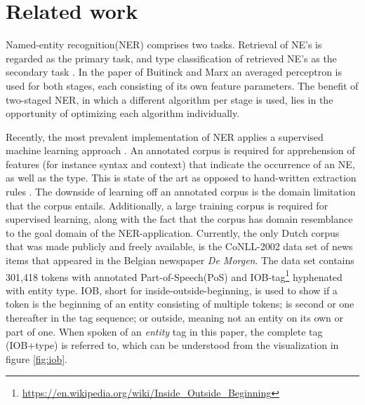 
\section{Related work} \label{sec:rel}
Named-entity recognition(NER) comprises two tasks. Retrieval of NE's is regarded as the primary task, and type classification of retrieved NE's as the secondary task \cite{buitinck2012two}. In the paper of Buitinck and Marx an averaged perceptron is used for both stages, each consisting of its own feature parameters. The benefit of two-staged NER, in which a different algorithm per stage is used, lies in the opportunity of optimizing each algorithm individually.  

Recently, the most prevalent implementation  of NER applies a supervised machine learning approach . An annotated corpus is required for apprehension of features (for instance syntax and context) that indicate the occurrence of an NE, as well as the type. This is state of the art as opposed to hand-written extraction rules . The downside of learning off an annotated corpus is the domain limitation that the corpus entails. Additionally, a large training corpus is required for supervised learning, along with the fact that the corpus has domain resemblance to the goal domain of the NER-application. Currently, the only Dutch corpus that was made publicly and freely available, is the CoNLL-2002 data set of news items that appeared in the Belgian newspaper \textit{De Morgen}. The data set contains 301,418 tokens with annotated Part-of-Speech(PoS) and IOB-tag\footnote{\url{https://en.wikipedia.org/wiki/Inside_Outside_Beginning}} hyphenated with entity type. IOB, short for inside-outside-beginning, is used to show if a token is the beginning of an entity consisting of multiple tokens; is second or one thereafter in the tag sequence; or outside, meaning not an entity on its own or part of one. When spoken of an \textit{entity} tag in this paper, the complete tag (IOB+type) is referred to, which can be understood from the visualization in figure \ref{fig:iob}.

